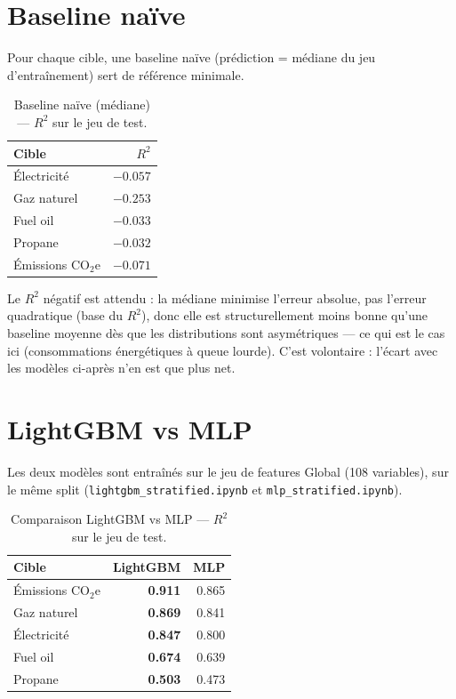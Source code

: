 \documentclass[11pt,a4paper]{article}
\newcommand{\code}[1]{\texttt{#1}}
\begin{document}
\section{Baseline naïve}

Pour chaque cible, une baseline naïve (prédiction = médiane du jeu d'entraînement) sert de
référence minimale.

\begin{table}[H]
\centering
\caption{Baseline naïve (médiane) --- $R^2$ sur le jeu de test.}
\begin{tabular}{lr}
\toprule
Cible & $R^2$ \\
\midrule
Électricité      & $-0.057$ \\
Gaz naturel       & $-0.253$ \\
Fuel oil          & $-0.033$ \\
Propane           & $-0.032$ \\
Émissions CO$_2$e & $-0.071$ \\
\bottomrule
\end{tabular}
\end{table}

Le $R^2$ négatif est attendu : la médiane minimise l'erreur absolue, pas l'erreur quadratique
(base du $R^2$), donc elle est structurellement moins bonne qu'une baseline moyenne dès que les
distributions sont asymétriques --- ce qui est le cas ici (consommations énergétiques à queue
lourde). C'est volontaire : l'écart avec les modèles ci-après n'en est que plus net.

\section{LightGBM vs MLP}

Les deux modèles sont entraînés sur le jeu de features \og{}Global\fg{} (108 variables), sur le
même split (\code{lightgbm\_stratified.ipynb} et \code{mlp\_stratified.ipynb}).

\begin{table}[H]
\centering
\caption{Comparaison LightGBM vs MLP --- $R^2$ sur le jeu de test.}
\begin{tabular}{lrr}
\toprule
Cible & LightGBM & MLP \\
\midrule
Émissions CO$_2$e & \textbf{0.911} & 0.865 \\
Gaz naturel        & \textbf{0.869} & 0.841 \\
Électricité        & \textbf{0.847} & 0.800 \\
Fuel oil            & \textbf{0.674} & 0.639 \\
Propane             & \textbf{0.503} & 0.473 \\
\bottomrule
\end{tabular}
\end{table}
\end{document}
